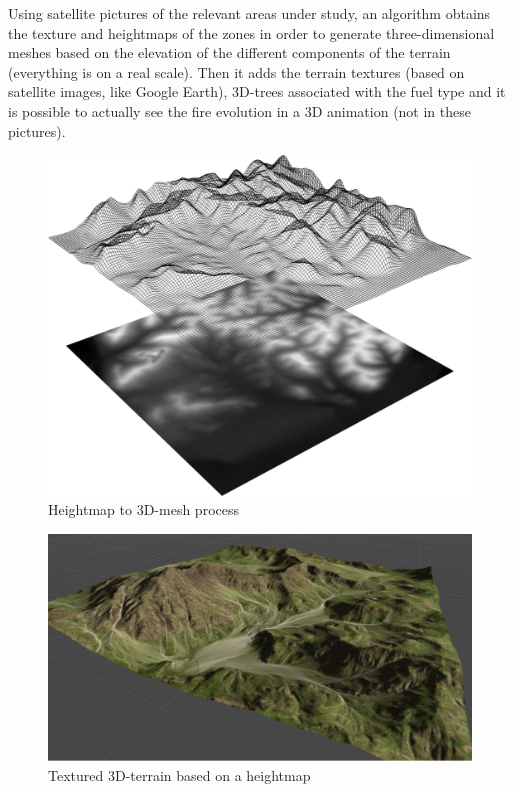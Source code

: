 \documentclass[11pt]{article}
\begin{document}
Using satellite pictures of the relevant areas under study, an algorithm obtains the texture and heightmaps of the zones in order to generate three-dimensional meshes based on the elevation of the different components of the terrain (everything is on a real scale). Then it adds the terrain textures (based on satellite images, like Google Earth), 3D-trees associated with the fuel type and it is possible to actually see the fire evolution in a 3D animation (not in these pictures).\\

\begin{figure}[!h]
\centering
\includegraphics[scale=0.55]{Heightmap1.png}
\caption{\label{hm1} Heightmap to 3D-mesh process}
\end{figure}

\begin{figure}[!h]
\centering
\includegraphics[scale=0.30]{texturedmap.jpg}
\caption{\label{tm1} Textured 3D-terrain based on a heightmap}
\end{figure}
\end{document}
